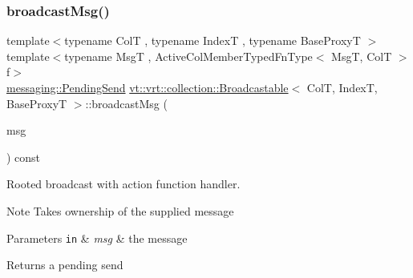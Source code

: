 \subsubsection{\texorpdfstring{broadcast\+Msg()}{broadcastMsg()}\hspace{0.1cm}{\footnotesize\ttfamily [1/2]}}
{\footnotesize\ttfamily template$<$typename ColT , typename IndexT , typename Base\+ProxyT $>$ \\
template$<$typename MsgT , Active\+Col\+Member\+Typed\+Fn\+Type$<$ Msg\+T, Col\+T $>$ f$>$ \\
\hyperlink{structvt_1_1messaging_1_1_pending_send}{messaging\+::\+Pending\+Send} \hyperlink{structvt_1_1vrt_1_1collection_1_1_broadcastable}{vt\+::vrt\+::collection\+::\+Broadcastable}$<$ ColT, IndexT, Base\+ProxyT $>$\+::broadcast\+Msg (\begin{DoxyParamCaption}\item[{\hyperlink{structvt_1_1messaging_1_1_msg_ptr_thief}{messaging\+::\+Msg\+Ptr\+Thief}$<$ MsgT $>$}]{msg }\end{DoxyParamCaption}) const}



Rooted broadcast with action function handler. 

\begin{DoxyNote}{Note}
Takes ownership of the supplied message
\end{DoxyNote}

\begin{DoxyParams}[1]{Parameters}
\mbox{\tt in}  & {\em msg} & the message\\
\hline
\end{DoxyParams}
\begin{DoxyReturn}{Returns}
a pending send 
\end{DoxyReturn}
\mbox{\label{structvt_1_1vrt_1_1collection_1_1_broadcastable_a520d37e5da6ce89657f6d33162a23003}} 
